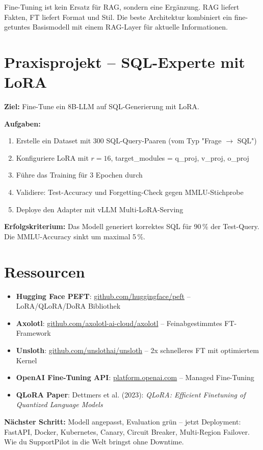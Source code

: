 \par\mbox{}\par
\begin{merkeEnv}
Fine-Tuning ist kein Ersatz für RAG, sondern eine Ergänzung. RAG liefert Fakten, FT liefert Format und Stil. Die beste Architektur kombiniert ein fine-getuntes Basismodell mit einem RAG-Layer für aktuelle Informationen.
\end{merkeEnv}

\section{Praxisprojekt -- SQL-Experte mit LoRA}

\textbf{Ziel:} Fine-Tune ein 8B-LLM auf SQL-Generierung mit LoRA.

\textbf{Aufgaben:}
\begin{enumerate}[leftmargin=*]
    \item Erstelle ein Dataset mit 300 SQL-Query-Paaren (vom Typ "Frage $\rightarrow$ SQL")
    \item Konfiguriere LoRA mit $r=16$, target\_modules = q\_proj, v\_proj, o\_proj
    \item Führe das Training für 3 Epochen durch
    \item Validiere: Test-Accuracy und Forgetting-Check gegen MMLU-Stichprobe
    \item Deploye den Adapter mit vLLM Multi-LoRA-Serving
\end{enumerate}

\textbf{Erfolgskriterium:} Das Modell generiert korrektes SQL für 90\,\% der Test-Query. Die MMLU-Accuracy sinkt um maximal 5\,\%.

\section{Ressourcen}

\begin{itemize}[leftmargin=*]
    \item \textbf{Hugging Face PEFT}: \href{https://github.com/huggingface/peft}{github.com/huggingface/peft} -- LoRA/QLoRA/DoRA Bibliothek
    \item \textbf{Axolotl}: \href{https://github.com/axolotl-ai-cloud/axolotl}{github.com/axolotl-ai-cloud/axolotl} -- Feinabgestimmtes FT-Framework
    \item \textbf{Unsloth}: \href{https://github.com/unslothai/unsloth}{github.com/unslothai/unsloth} -- 2x schnelleres FT mit optimiertem Kernel
    \item \textbf{OpenAI Fine-Tuning API}: \href{https://platform.openai.com/docs/guides/fine-tuning}{platform.openai.com} -- Managed Fine-Tuning
    \item \textbf{QLoRA Paper}: Dettmers et al. (2023): \textit{QLoRA: Efficient Finetuning of Quantized Language Models}
\end{itemize}

\textbf{Nächster Schritt:} Modell angepasst, Evaluation grün -- jetzt Deployment: FastAPI, Docker, Kubernetes, Canary, Circuit Breaker, Multi-Region Failover. Wie du SupportPilot in die Welt bringst ohne Downtime.
\endinput

\clearpage
